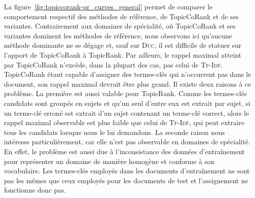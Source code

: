         La figure~\ref{fig:topiccorank-pr_curves_general} permet de comparer le
        comportement respectif des méthodes de référence, de TopicCoRank et de
        ses variantes. Contrairement aux domaines de spécialité, où TopicCoRank
        et ses variantes dominent les méthodes de référence, nous observons ici
        qu'aucune méthode dominante ne se dégage et, sauf sur \textsc{Duc}, il
        est difficile de statuer sur l'apport de TopicCoRank à TopicRank. Par
        ailleurs, le rappel maximal atteint par TopicCoRank n'excède, dans la
        plupart des cas, pas celui de \textsc{Tf-Idf}. TopicCoRank étant capable
        d'assigner des termes-clés qui n'occurrent pas dans le document, son
        rappel maximal devrait être plus grand. Il existe deux raisons à ce
        problème. La première est aussi valable pour TopicRank. Comme les
        termes-clés candidats sont groupés en sujets et qu'un seul d'entre eux
        est extrait par sujet, si un terme-clé erroné est extrait d'un sujet
        contenant un terme-clé correct, alors le rappel maximal observable est
        plus faible que celui de \textsc{Tf-Idf}, qui peut extraire tous les
        candidats lorsque nous le lui demandons. La seconde raison nous
        intéresse particulièrement, car elle n'est pas observable en domaines de
        spécialité. En effet, le problème est aussi due à l'inconsistance des
        données d'entraînement pour représenter un \og{}domaine\fg{} de manière
        homogène et conforme à son vocabulaire. Les termes-clés employés dans
        les documents d'entraînement ne sont pas les mêmes que ceux employés
        pour les documents de test et l'assignement ne fonctionne donc pas.
        

